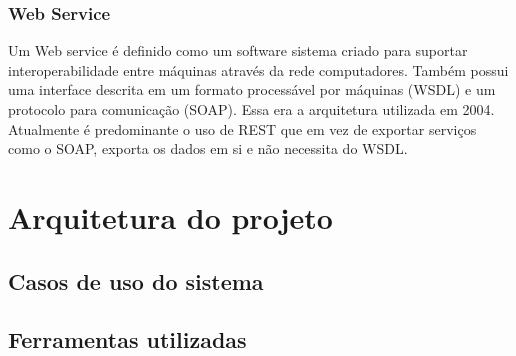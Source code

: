 \documentclass[
	12pt,				%
	openright,			%
	twoside,			%
	a4paper,			%
	english,			%
	brazil				%
	]{abntex2}
\begin{document}
		\subsection{Web Service}
		\cite{webService-W3C}
		Um Web service é definido como um software sistema criado para suportar interoperabilidade entre máquinas através da rede computadores. Também possui uma interface descrita em um formato processável por máquinas (WSDL) e um protocolo para comunicação (SOAP). \cite{webService-W3C}
		Essa era a arquitetura utilizada em 2004. Atualmente é predominante o uso de REST que em vez de exportar serviços como o SOAP, exporta os dados em si e não necessita do WSDL. \cite{soapVSrest}
		
\chapter{Arquitetura do projeto}\label{cap_trabalho_academico}

	\section{Casos de uso do sistema}
	\section{Ferramentas utilizadas}

\end{document}
